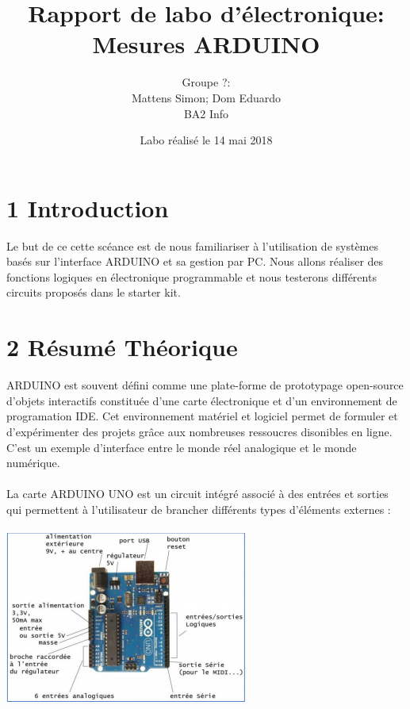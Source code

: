 \documentclass{report}
\title{Rapport de labo d'\'electronique: \\ Mesures ARDUINO}
\author{Groupe ?: \\ Mattens Simon; Dom Eduardo \\ BA2 Info}
\date{Labo r\'ealis\'e le 14 mai 2018}
\begin{document}
\maketitle

\section*{1 Introduction}
Le but de ce cette scéance est de nous familiariser à l'utilisation de systèmes basés sur l'interface ARDUINO et sa gestion par PC. Nous allons réaliser des fonctions logiques en électronique programmable et nous testerons différents circuits proposés dans le starter kit.\\

\section*{2 R\'esum\'e Th\'eorique}
ARDUINO est souvent défini comme une plate-forme de prototypage open-source d'objets interactifs constituée d'une carte électronique et d'un environnement de programation IDE. Cet environnement matériel et logiciel permet de formuler et d'expérimenter des projets grâce aux nombreuses ressoucres disonibles en ligne.\\
C'est un exemple d'interface entre le monde réel analogique et le monde numérique.\\
\\La carte ARDUINO UNO est un circuit intégré associé à des entrées et sorties qui permettent à l'utilisateur de brancher différents types d'éléments externes : \\
\\
\includegraphics{Arduino.png}
 
\end{document}

